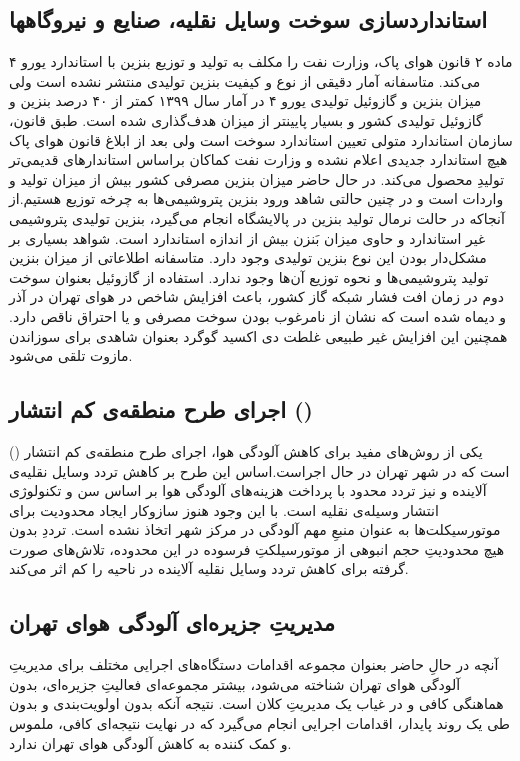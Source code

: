 \documentclass[12pt]{atu}
\begin{document}
\subsection{استانداردسازی سوخت وسایل نقلیه، صنایع و نیروگاهها}
ماده ۲ قانون هوای پاک، وزارت نفت را مکلف به تولید و توزیع بنزین با استاندارد یورو ۴ می‌کند. متاسفانه آمار دقیقی از نوع و کیفیت بنزین تولیدی منتشر نشده است ولی میزان بنزین و گازوئیل تولیدی یورو ۴ در آمار سال  ۱۳۹۹ کمتر از ۴۰ درصد بنزین و گازوئیل تولیدی کشور و بسیار پایینتر از میزان هدف‌گذاری شده است. طبق قانون، سازمان استاندارد متولی تعیین استاندارد سوخت است ولی بعد از ابلاغ قانون هوای پاک هیچ استاندارد جدیدی اعلام نشده و وزارت نفت کماکان براساس استاندارهای قدیمی‌تر تولیدِ محصول می‌کند.
در حال حاضر میزان بنزین مصرفی کشور بیش از میزان تولید و واردات است و در چنین حالتی شاهد ورود بنزین پتروشیمی‌ها به چرخه توزیع هستیم.از آنجاکه در حالت نرمال تولید بنزین در پالایشگاه انجام می‌گیرد، بنزین تولیدی پتروشیمی غیر استاندارد و حاوی میزان بَنزن بیش از اندازه استاندارد است. شواهد بسیاری بر مشکل‌دار بودن این نوع بنزین تولیدی وجود دارد. متاسفانه اطلاعاتی از میزان بنزین تولید پتروشیمی‌ها و نحوه توزیع آن‌ها وجود ندارد.
استفاده از گازوئیل بعنوان سوخت دوم در زمان افت فشار شبکه گاز کشور، باعث افزایش  شاخص {\scriptsize {}} در هوای تهران در آذر و دیماه شده است که نشان از نامرغوب بودن سوخت مصرفی و یا احتراق ناقص دارد. همچنین این افزایش غیر طبیعی غلطت دی اکسید گوگرد بعنوان شاهدی برای سوزاندن مازوت تلقی می‌شود.
\subsection{اجرای طرح منطقه‌ی کم انتشار ()}
یکی از روش‌های مفید برای کاهش آلودگی هوا، اجرای طرح منطقه‌ی کم انتشار ()  است که در شهر تهران در حال اجراست.اساس این طرح بر کاهش تردد وسایل نقلیه‌ی آلاینده و نیز تردد محدود با پرداخت هزینه‌های آلودگی هوا بر اساس سن و تکنولوژ‌ی انتشار وسیله‌ی نقلیه است. با این وجود هنوز سازوکار ایجاد محدودیت برای موتورسیکلت‌ها به عنوان منبعِ مهم آلودگی در مرکز شهر اتخاذ نشده است. ترددِ بدون هیچ محدودیتِ حجم انبوهی از موتورسیلکتِ فرسوده در این محدوده، تلاش‌های صورت گرفته برای کاهش تردد وسایل نقلیه آلاینده  در ناحیه   را کم اثر می‌کند.
\subsection{مدیریتِ جزیره‌ای آلودگی هوای تهران}
آنچه در حالِ حاضر بعنوان مجموعه اقدامات دستگاه‌های اجرایی مختلف برای مدیریتِ آلودگی هوای تهران شناخته می‌شود، بیشتر مجموعه‌ای فعالیت‌ِ جزیره‌ای، بدون هماهنگی کافی و در غیاب یک مدیریتِ کلان است. نتیجه آنکه بدون اولویت‌بندی و بدون طی یک روند پایدار، اقدامات اجرایی انجام می‌گیرد که در نهایت نتیجه‌ای کافی، ملموس و کمک کننده به کاهش آلودگی هوای تهران ندارد.
\end{document}
